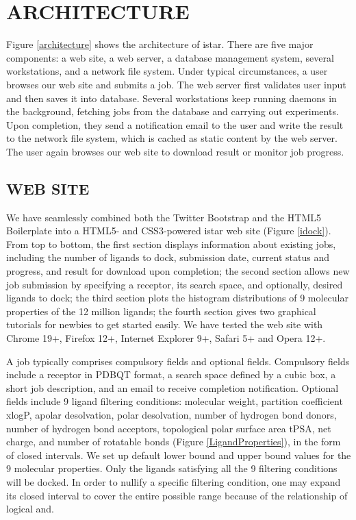 \documentclass[12pt]{article}
\begin{document}
\section*{\sffamily \Large ARCHITECTURE}

Figure \ref{architecture} shows the architecture of istar. There are five major components: a web site, a web server, a database management system, several workstations, and a network file system. Under typical circumstances, a user browses our web site and submits a job. The web server first validates user input and then saves it into database. Several workstations keep running daemons in the background, fetching jobs from the database and carrying out experiments. Upon completion, they send a notification email to the user and write the result to the network file system, which is cached as static content by the web server. The user again browses our web site to download result or monitor job progress.

\subsection*{\sffamily \large WEB SITE}

We have seamlessly combined both the Twitter Bootstrap and the HTML5 Boilerplate into a HTML5- and CSS3-powered istar web site (Figure \ref{idock}). From top to bottom, the first section displays information about existing jobs, including the number of ligands to dock, submission date, current status and progress, and result for download upon completion; the second section allows new job submission by specifying a receptor, its search space, and optionally, desired ligands to dock; the third section plots the histogram distributions of 9 molecular properties of the 12 million ligands; the fourth section gives two graphical tutorials for newbies to get started easily. We have tested the web site with Chrome 19+, Firefox 12+, Internet Explorer 9+, Safari 5+ and Opera 12+.

A job typically comprises compulsory fields and optional fields. Compulsory fields include a receptor in PDBQT format, a search space defined by a cubic box, a short job description, and an email to receive completion notification. Optional fields include 9 ligand filtering conditions: molecular weight, partition coefficient xlogP, apolar desolvation, polar desolvation, number of hydrogen bond donors, number of hydrogen bond acceptors, topological polar surface area tPSA, net charge, and number of rotatable bonds (Figure \ref{LigandProperties}), in the form of closed intervals. We set up default lower bound and upper bound values for the 9 molecular properties. Only the ligands satisfying all the 9 filtering conditions will be docked. In order to nullify a specific filtering condition, one may expand its closed interval to cover the entire possible range because of the relationship of logical and.
\end{document}
